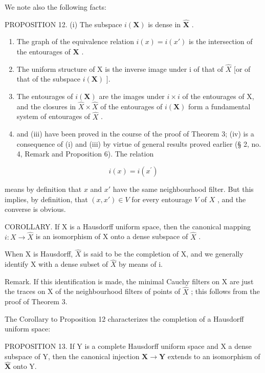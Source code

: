 We note also the following facts:

PROPOSITION 12. (i) The subspace \(i(\mathbf{X})\) is dense in \(\hat{\mathbf{X}}\) .

\begin{enumerate}
\def\labelenumi{(\roman{enumi})}
\setcounter{enumi}{1}
\item
  The graph of the equivalence relation \(i(x) = i(x')\) is the intersection of the entourages of \(\mathbf{X}\) .
\item
  The uniform structure of X is the inverse image under i of that of \(\hat{X}\) {[}or of that of the subspace \(i(\mathbf{X})\) {]}.
\item
  The entourages of \(i(\mathbf{X})\) are the images under \(i \times i\) of the entourages of X, and the closures in \(\hat{X} \times \hat{X}\) of the entourages of \(i(\mathbf{X})\) form a fundamental system of entourages of \(\hat{X}\) .
\item
  and (iii) have been proved in the course of the proof of Theorem 3; (iv) is a consequence of (i) and (iii) by virtue of general results proved earlier (§ 2, no. 4, Remark and Proposition 6). The relation
\end{enumerate}

\[
i (x) = i \left(x ^ {\prime}\right)
\]

means by definition that \(x\) and \(x'\) have the same neighbourhood filter. But this implies, by definition, that \((x, x') \in V\) for every entourage \(V\) of \(X\) , and the converse is obvious.

COROLLARY. If X is a Hausdorff uniform space, then the canonical mapping \(i: X \to \hat{X}\) is an isomorphism of X onto a dense subspace of \(\hat{X}\) .

When X is Hausdorff, \(\hat{X}\) is said to be the completion of X, and we generally identify X with a dense subset of \(\hat{X}\) by means of i.

Remark. If this identification is made, the minimal Cauchy filters on X are just the traces on X of the neighbourhood filters of points of \(\hat{X}\) ; this follows from the proof of Theorem 3.

The Corollary to Proposition 12 characterizes the completion of a Hausdorff uniform space:

PROPOSITION 13. If Y is a complete Hausdorff uniform space and X a dense subspace of Y, then the canonical injection \(\mathbf{X} \to \mathbf{Y}\) extends to an isomorphism of \(\hat{\mathbf{X}}\) onto Y.

